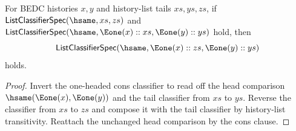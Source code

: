 \begin{theorem}
\label{thm:list-classifier-spec-hsame-e1-cons-tail-transport}
For BEDC histories $x,y$ and history-list tails $xs,ys,zs$, if
$\mathsf{ListClassifierSpec}(\hsame,xs,zs)$ and
$\mathsf{ListClassifierSpec}(\hsame,\Eone(x)::xs,\Eone(y)::ys)$ hold, then
$$
\mathsf{ListClassifierSpec}(\hsame,\Eone(x)::zs,\Eone(y)::ys)
$$
holds.
\end{theorem}
\begin{proof}
Invert the one-headed cons classifier to read off the head comparison
$\hsame(\Eone(x),\Eone(y))$ and the tail classifier from $xs$ to $ys$.
Reverse the classifier from $xs$ to $zs$ and compose it with the tail
classifier by history-list transitivity. Reattach the unchanged head
comparison by the cons clause.
\end{proof}
